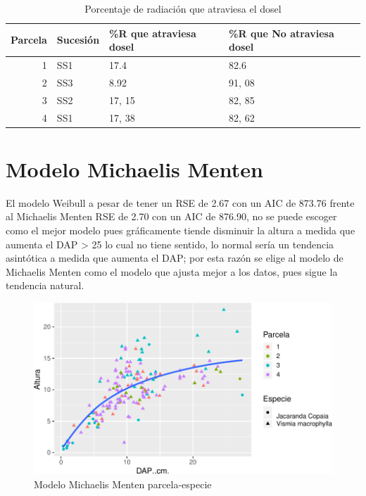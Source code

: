 \documentclass[letterpaper,9pt,twocolumn,twoside,]{pinp}
\begin{document}
\begin{table}

\caption{\label{tab:unnamed-chunk-3}Porcentaje de radiación que atraviesa el dosel}
\centering
\begin{tabular}[t]{r|l|l|l}
\hline
Parcela & Sucesión & \%R que atraviesa dosel & \%R que No atraviesa dosel\\
\hline
1 & SS1 & 17.4 & 82.6\\
\hline
2 & SS3 & 8.92 & 91, 08\\
\hline
3 & SS2 & 17, 15 & 82, 85\\
\hline
4 & SS1 & 17, 38 & 82, 62\\
\hline
\end{tabular}
\end{table}

\hypertarget{modelo-michaelis-menten}{%
\section{Modelo Michaelis Menten}\label{modelo-michaelis-menten}}

El modelo Weibull a pesar de tener un RSE de 2.67 con un AIC de 873.76
frente al Michaelis Menten RSE de 2.70 con un AIC de 876.90, no se puede
escoger como el mejor modelo pues gráficamente tiende disminuir la
altura a medida que aumenta el DAP \textgreater{} 25 lo cual no tiene
sentido, lo normal sería un tendencia asintótica a medida que aumenta el
DAP; por esta razón se elige al modelo de Michaelis Menten como el
modelo que ajusta mejor a los datos, pues sigue la tendencia natural.

\begin{figure}

{\centering \includegraphics{report_ecology_files/figure-latex/unnamed-chunk-6-1} 

}

\caption{Modelo Michaelis Menten parcela-especie}\label{fig:unnamed-chunk-6}
\end{figure}
\end{document}
